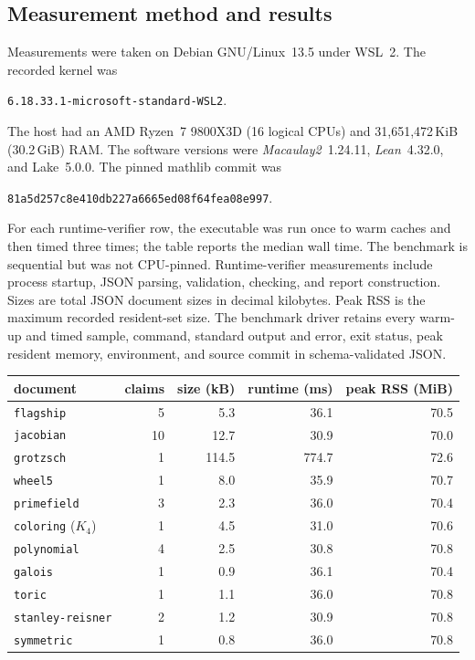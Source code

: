 \documentclass[11pt]{article}
\newcommand{\M}{\textit{Macaulay2}}
\newcommand{\lean}{\textit{Lean}}
\newcommand{\mathlib}{\textsf{mathlib}}
\newcommand{\code}[1]{\texttt{#1}}
\begin{document}
\subsection{Measurement method and results}

Measurements were taken on Debian GNU/Linux~13.5 under WSL~2.  The
recorded kernel was
\begin{center}\small
\code{6.18.33.1-microsoft-standard-WSL2}.
\end{center}
The host had an AMD Ryzen~7 9800X3D (16 logical CPUs) and
31,651,472\,KiB (30.2\,GiB) RAM.  The software
versions were \M{}~1.24.11, \lean{}~4.32.0, and Lake~5.0.0.  The pinned
\mathlib{} commit was
\begin{center}\small
\code{81a5d257c8e410db227a6665ed08f64fea08e997}.
\end{center}
For each runtime-verifier row, the executable was run once to warm
caches and then timed three times; the table reports the median wall
time.  The benchmark is sequential but was not CPU-pinned.
Runtime-verifier measurements include process startup, JSON parsing,
validation, checking, and report construction.  Sizes are total JSON
document sizes in decimal kilobytes.  Peak RSS is the maximum recorded
resident-set size.  The benchmark driver retains every warm-up and timed
sample, command, standard output and error, exit status, peak resident
memory, environment, and source commit in schema-validated JSON.

\begin{center}
\small
\begin{tabular}{lrrrr}
\toprule
document & claims & size (kB) & runtime (ms) & peak RSS (MiB) \\
\midrule
\code{flagship} & 5 & 5.3 & 36.1 & 70.5 \\
\code{jacobian} & 10 & 12.7 & 30.9 & 70.0 \\
\code{grotzsch} & 1 & 114.5 & 774.7 & 72.6 \\
\code{wheel5} & 1 & 8.0 & 35.9 & 70.7 \\
\code{primefield} & 3 & 2.3 & 36.0 & 70.4 \\
\code{coloring} ($K_4$) & 1 & 4.5 & 31.0 & 70.6 \\
\code{polynomial} & 4 & 2.5 & 30.8 & 70.8 \\
\code{galois} & 1 & 0.9 & 36.1 & 70.4 \\
\code{toric} & 1 & 1.1 & 36.0 & 70.8 \\
\code{stanley-reisner} & 2 & 1.2 & 30.9 & 70.8 \\
\code{symmetric} & 1 & 0.8 & 36.0 & 70.8 \\
\bottomrule
\end{tabular}
\end{center}
\end{document}

